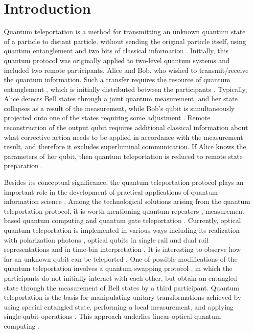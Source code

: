 \documentclass{optica-article}
\begin{document}
\section{Introduction}
Quantum teleportation is a method for transmitting an unknown quantum state of a particle to distant particle, without sending the original particle itself, using quantum entanglement and two bits of classical information \cite{1}. Initially, this quantum protocol was originally applied to two-level quantum systems and included two remote participants, Alice and Bob, who wished to transmit/receive the quantum information. Such a transfer requires the resource of quantum entanglement \cite{2,3}, which is initially distributed between the participants \cite{1}. Typically, Alice detects Bell states \cite{2} through a joint quantum measurement, and her state collapses as a result of the measurement, while Bob's qubit is simultaneously projected onto one of the states requiring some adjustment \cite{4}. Remote reconstruction of the output qubit requires additional classical information about what corrective action needs to be applied in accordance with the measurement result, and therefore it excludes superluminal communication. If Alice knows the parameters of her qubit, then quantum teleportation is reduced to remote state preparation \cite{5}.  
\par Besides its conceptual significance, the quantum teleportation protocol plays an important role in the development of practical applications of quantum information science \cite{6,7,8}. Among the technological solutions arising from the quantum teleportation protocol, it is worth mentioning quantum repeaters \cite{9}, measurement-based quantum computing \cite{10} and quantum gate teleportation \cite{11}. Currently, optical quantum teleportation is implemented in various ways including its realization with polarization photons \cite{12,13,14}, optical qubits in single rail \cite{15,16} and dual rail \cite{17,18} representations and in time-bin interpretation \cite{19}. It is interesting to observe how far an unknown qubit can be teleported \cite{20,21}. One of possible modifications of the quantum teleportation involves a quantum swapping protocol \cite{22,23}, in which the participants do not initially interact with each other, but obtain an entangled state through the measurement of Bell states by a third participant. Quantum teleportation is the basis for manipulating unitary transformations achieved by using special entangled state, performing a local measurement, and applying single-qubit operations \cite{7,11}. This approach underlies linear-optical quantum computing \cite{24,25}.
\end{document}
